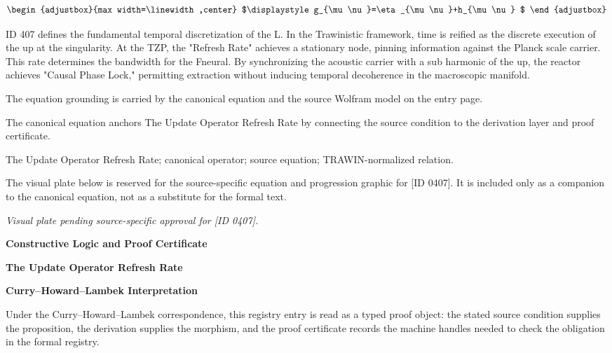 \[
\begin{adjustbox}{max width=\linewidth,center}
$\displaystyle
g_{\mu\nu}=\eta_{\mu\nu}+h_{\mu\nu}
$
\end{adjustbox}
\]

ID 407 defines the fundamental temporal discretization of the L. In the Trawinistic framework, time is reified as the discrete execution of the up at the singularity. At the TZP, the "Refresh Rate" achieves a stationary node, pinning information against the Planck scale carrier. This rate determines the bandwidth for the Fneural. By synchronizing the acoustic carrier with a sub harmonic of the up, the reactor achieves "Causal Phase Lock," permitting extraction without inducing temporal decoherence in the macroscopic manifold.

The equation grounding is carried by the canonical equation and the source Wolfram model on the entry page.

The canonical equation anchors The Update Operator Refresh Rate by connecting the source condition to the derivation layer and proof certificate.

The Update Operator Refresh Rate; canonical operator; source equation; TRAWIN-normalized relation.
\endgroup

\begingroup\footnotesize\sloppy
The visual plate below is reserved for the source-specific equation and progression graphic for [ID 0407]. It is included only as a companion to the canonical equation, not as a substitute for the formal text.
\par\endgroup
\begingroup\footnotesize\itshape
Visual plate pending source-specific approval for [ID 0407].
\par\endgroup

\clearpage
\begingroup\tzpsupportsetup
\noindent\textbf{\fontsize{10.8pt}{12.8pt}\selectfont [ID 0407] Constructive Logic and Proof Certificate}\par
\noindent\textbf{\fontsize{10pt}{12pt}\selectfont The Update Operator Refresh Rate}\par
\vspace{0.45em}
\begingroup
\footnotesize
\setlength{\parskip}{0.22em}
\setlength{\parindent}{0pt}
\noindent\textbf{Curry--Howard--Lambek Interpretation}\par
Under the Curry--Howard--Lambek correspondence, this registry entry is read as a typed proof
object: the stated source condition supplies the proposition, the derivation supplies the
morphism, and the proof certificate records the machine handles needed to check the obligation
in the formal registry.

